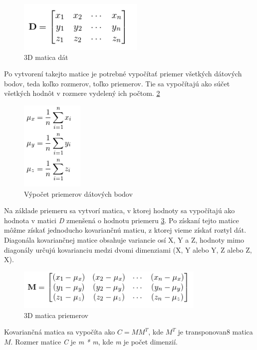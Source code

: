 \begin{figure}[H]
  \centering
  \includegraphics[width=6cm]{img/PCAdatamx.png}
  \caption{3D matica dát \cite{c21}}
  \label{PCAdatamx}
\end{figure}

Po vytvorení takejto matice je potrebné vypočítať priemer všetkých dátových bodov, teda koľko rozmerov, toľko priemerov. Tie sa vypočítajú ako súčet všetkých hodnôt v rozmere vydelený ich počtom. \ref{PCAmean}

\begin{figure}[H]
  \centering
  \includegraphics[width=3cm]{img/PCAdatamean.png}
  \caption{Výpočet priemerov dátových bodov\cite{c21}}
  \label{PCAmean}
\end{figure}

Na základe priemeru sa vytvorí matica, v ktorej hodnoty sa vypočítajú ako hodnota v matici \textit{D} zmenšená o hodnotu priemeru \ref{PCAdatamx2}. Po získaní tejto matice môžme získať jednoducho kovariančnú maticu, z ktorej vieme získať roztyl dát. Diagonála kovariančnej matice obsahuje variancie osí X, Y a Z, hodnoty mimo diagonály určujú kovarianciu medzi dvomi dimenziami (X, Y alebo Y, Z alebo Z, X). 

\begin{figure}[H]
  \centering
  \includegraphics[width=9cm]{img/PCAdatamx2.png}
  \caption{3D matica priemerov\cite{c21}}
  \label{PCAdatamx2}
\end{figure}

Kovariančná matica sa vypočíta ako $C = MM^T$, kde $M^T$ je transponovan8 matica $M$. Rozmer matice \textit{C} je \textit{m * m}, kde \textit{m} je počet dimenzií.


